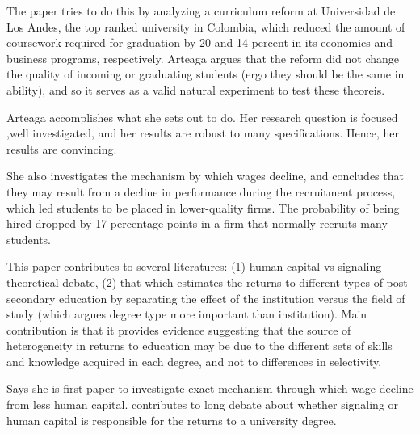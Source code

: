 \documentclass[a4paper, 11pt]{article}
\begin{document}
The paper tries to do this by analyzing a curriculum reform at Universidad de Los Andes, the top ranked university in Colombia, which reduced the amount of coursework required for graduation by 20 and 14 percent in its economics and business programs, respectively.   Arteaga argues that the reform did not change the quality of incoming or graduating students (ergo they should be the same in ability), and so it serves as a valid natural experiment to test these theoreis.

Arteaga accomplishes what she sets out to do. Her research question is focused ,well investigated, and her results are robust to many specifications.  Hence, her results are convincing.

  She also investigates the mechanism by which wages decline, and concludes that they may result from a decline in performance during the recruitment process, which led students to be placed in lower-quality firms.  The probability of being hired dropped by 17 percentage points in a firm that normally recruits many students.



This paper contributes to several literatures: (1) human capital vs signaling theoretical debate, (2) that which estimates the returns to different types of post-secondary education by separating the effect of the institution versus the field of study (which argues degree type more important than institution). Main contribution is that it provides evidence suggesting that the source of heterogeneity in returns to education may be due to the different sets of skills and knowledge acquired in each degree, and not to differences in selectivity.

Says she is first paper to investigate exact mechanism through which wage decline from less human capital.   contributes to long debate about whether signaling or human capital is responsible for the returns to a university degree. 
\end{document}
